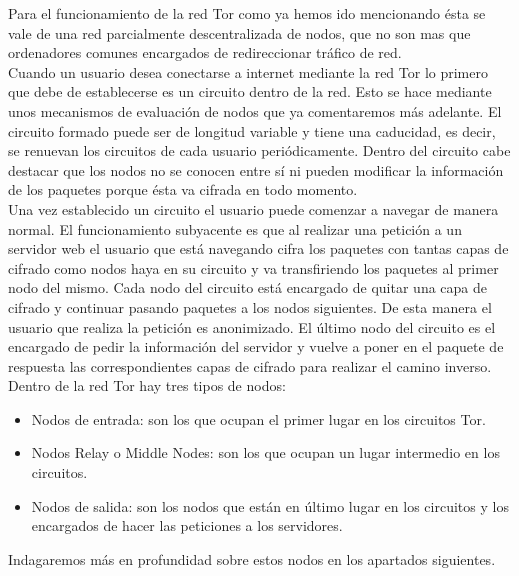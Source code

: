 Para el funcionamiento de la red Tor como ya hemos ido mencionando ésta se vale de una red parcialmente descentralizada de nodos, que no son mas que ordenadores comunes encargados de redireccionar tráfico de red.\\
Cuando un usuario desea conectarse a internet mediante la red Tor lo primero que debe de establecerse es un circuito dentro de la red. Esto se hace mediante unos mecanismos de evaluación de nodos que ya comentaremos más adelante. El circuito formado puede ser de longitud variable y tiene una caducidad, es decir, se renuevan los circuitos de cada usuario periódicamente. Dentro del circuito cabe destacar que los nodos no se conocen entre sí ni pueden modificar la información de los paquetes porque ésta va cifrada en todo momento.\\
Una vez establecido un circuito el usuario puede comenzar a navegar de manera normal. El funcionamiento subyacente es que al realizar una petición a un servidor web el usuario que está navegando cifra los paquetes con tantas capas de cifrado como nodos haya en su circuito y va transfiriendo los paquetes al primer nodo del mismo. Cada nodo del circuito está encargado de quitar una capa de cifrado y continuar pasando paquetes a los nodos siguientes. De esta manera el usuario que realiza la petición es anonimizado. El último nodo del circuito es el encargado de pedir la información del servidor y vuelve a poner en el paquete de respuesta las correspondientes capas de cifrado para realizar el camino inverso.\\
Dentro de la red Tor hay tres tipos de nodos:
\begin{itemize}
	\item Nodos de entrada: son los que ocupan el primer lugar en los circuitos Tor.
	\item Nodos Relay o Middle Nodes: son los que ocupan un lugar intermedio en los circuitos.
	\item Nodos de salida: son los nodos que están en último lugar en los circuitos y los encargados de hacer las peticiones a los servidores.
\end{itemize}
Indagaremos más en profundidad sobre estos nodos en los apartados siguientes.